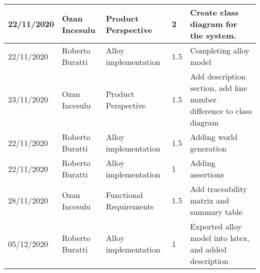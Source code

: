 \begin{table}[h]
\begin{tabular}{|p{2cm}|p{2cm}|p{2cm}|p{1.5cm}|p{8cm}|}
        22/11/2020 & Ozan Incesulu   & Product Perspective  & 2                & Create class diagram for the system. \\ \hline
        22/11/2020 & Roberto Buratti & Alloy implementation & 1.5              & Completing alloy model \\ \hline
        23/11/2020 & Ozan Incesulu   & Product Perspective  & 1.5              & Add description section, add line number difference to class diagram \\ \hline
        22/11/2020 & Roberto Buratti & Alloy implementation & 1.5              & Adding world generation \\ \hline
        22/11/2020 & Roberto Buratti & Alloy implementation & 1                & Adding assertions \\ \hline
        28/11/2020 & Ozan Incesulu   & Functional Requirements & 1.5           & Add traceability matrix and summary table\\ \hline
        05/12/2020 & Roberto Buratti & Alloy implementation & 1                & Exported alloy model into latex, and added description \\ \hline
    \end{tabular}
\end{table}

